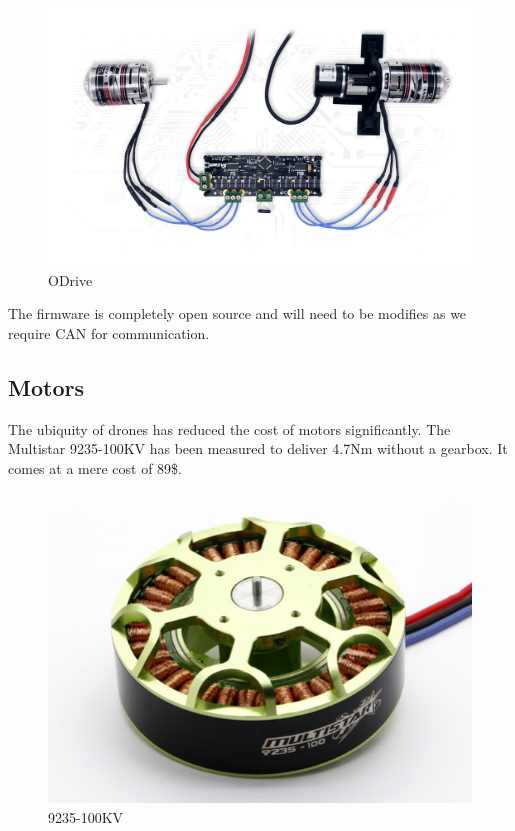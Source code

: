 \documentclass[12pt,journal,compsoc]{IEEEtran}
\begin{document}
\begin{figure}[H]
\centering
\caption{ODrive}
\includegraphics[scale=0.15]{images/odrive.png}
\end{figure}

The firmware is completely open source and will need to be modifies as we require CAN for communication.

\subsection{Motors}
The ubiquity of drones has reduced the cost of motors significantly. The Multistar 9235-100KV has been measured to deliver 4.7Nm \cite{9235T} without a gearbox. It comes at a mere cost of 89\$. 

\begin{figure}[H]
\centering
\caption{9235-100KV}
\includegraphics[scale=0.55]{images/motor.jpg}
\end{figure}
\end{document}
